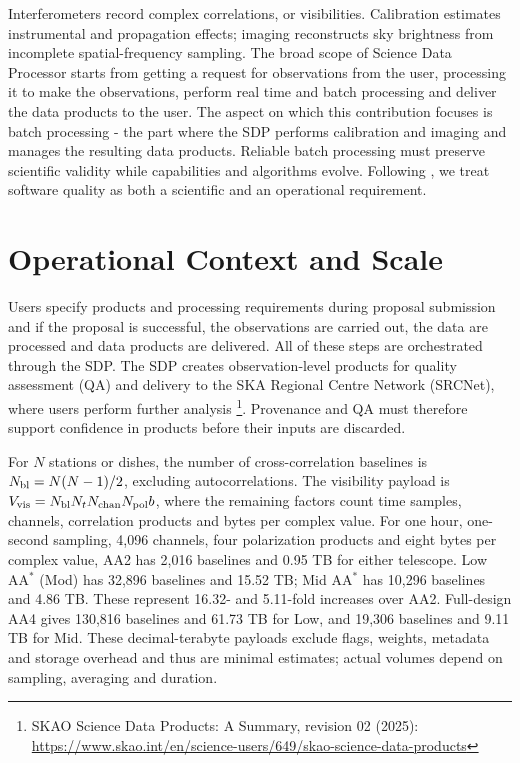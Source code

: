 \documentclass[11pt,twoside]{article}
\begin{document}
Interferometers record complex correlations, or visibilities. Calibration
estimates instrumental and propagation effects; imaging reconstructs sky
brightness from incomplete spatial-frequency sampling. The broad scope of Science Data Processor starts from getting a request for observations from the user, processing it to make the observations, perform real time and batch processing and deliver the data products to the user. The aspect on which this contribution focuses is batch processing - the part where the SDP performs calibration and imaging
and manages the resulting data products. Reliable batch processing must
 preserve scientific validity while capabilities and algorithms
evolve. Following \citet{Rees2019}, we treat software quality as both a
scientific and an operational requirement.

\section{Operational Context and Scale}
Users specify products and processing requirements during proposal submission and if the proposal is successful, the observations are carried out, the data are processed and data products are delivered. All of these steps are orchestrated through the SDP. The SDP creates observation-level products for
quality assessment (QA) and delivery to the SKA Regional Centre Network
(SRCNet), where users perform further analysis 
\footnote{\raggedright
SKAO Science Data Products: A Summary, revision 02 (2025):
\url{https://www.skao.int/en/science-users/649/skao-science-data-products}}.
Provenance and QA must therefore support confidence in products before
their inputs are discarded. 

For $N$ stations or dishes, the number of cross-correlation baselines is
$N_{\rm bl}=N(N-1)/2$, excluding autocorrelations. The visibility payload is
$V_{\rm vis}=N_{\rm bl}N_tN_{\rm chan}N_{\rm pol}b$, where the remaining
factors count time samples, channels, correlation products and bytes per
complex value. For one hour, one-second sampling, 4,096 channels, four polarization 
products and eight bytes per complex value, AA2 has 2,016 baselines and
0.95 TB for either telescope. Low AA$^*$ (Mod) has 32,896 baselines and
15.52 TB; Mid AA$^*$ has 10,296 baselines and 4.86 TB. These represent
16.32- and 5.11-fold increases over AA2. Full-design AA4 gives 130,816
baselines and 61.73 TB for Low, and 19,306 baselines and 9.11 TB for Mid.
These decimal-terabyte payloads exclude flags, weights, metadata and
storage overhead and thus are minimal estimates; actual volumes depend on sampling, averaging and duration.
\end{document}
